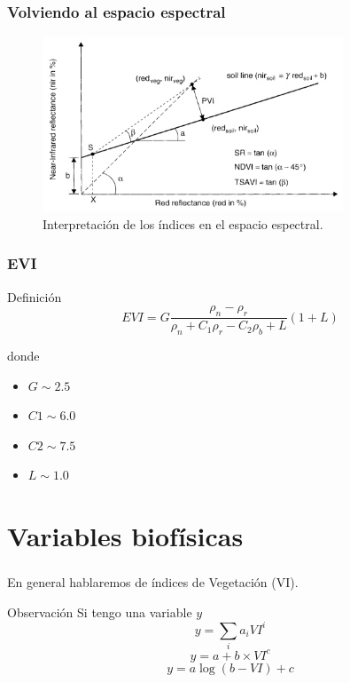 \documentclass[handout]{beamer}
\begin{document}
\begin{frame}
    \frametitle{Volviendo al espacio espectral}
    \begin{figure}
    \begin{center}
        \includegraphics[width=0.8\textwidth]{imagenes/int_graf.png}
    \end{center}
    \caption{Interpretación de los índices en el espacio
        espectral.}
    \end{figure}
\end{frame}

\begin{frame}
    \frametitle{EVI}
    \begin{block}{Definición}
        \begin{equation}
            EVI = G\frac{\rho_n - \rho_r}{\rho_n+C_1\rho_r-C_2\rho_b+L}(1+L)
        \end{equation}
    \end{block}
    donde
    \begin{itemize}
        \item $G  \sim 2.5$
        \item $C1 \sim 6.0$
        \item $C2 \sim 7.5$
        \item $L  \sim 1.0$
    \end{itemize}
\end{frame}

\section{Variables biofísicas}

\begin{frame}
    \frametitle{\subsecname}
    En general hablaremos de índices de Vegetación (VI).\pause\
    \begin{block}{Observación}
        Si tengo una variable $y$\pause\
        \begin{equation}
            y = \sum_i a_i VI^i
        \end{equation}
        \begin{equation}
            y = a + b \times VI^c
        \end{equation}
        \begin{equation}
            y = a \log(b-VI)+c
        \end{equation}
    \end{block}
\end{frame}
\end{document}
